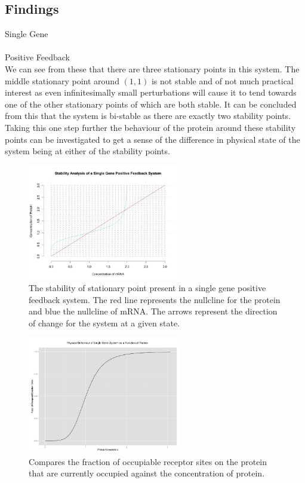 \documentclass[]{article}
\begin{document}
\subsection{Findings}
Single Gene\\
\\
Positive Feedback\\ 
We can see from these that there are three stationary points in this system. The middle stationary point around $(1,1)$ is not stable and of not much practical interest as even infinitesimally small perturbations will cause it to tend towards one of the other stationary points of which are both stable. It can be concluded from this that the system is bi-stable as there are exactly two stability points. Taking this one step further the behaviour of the protein around these stability points can be investigated to get a sense of the difference in physical state of the system being at either of the stability points. 
            
             \begin{figure}[h!]
            \centering
            \includegraphics[width=0.6\textwidth]{./figures/stabilitySinglePositive.jpeg}
            \caption{The stability of stationary point present in a single gene positive feedback system. The red line represents the nullcline for the protein and blue the nullcline of mRNA. The arrows represent the direction of change for the system at a given state.}
            \label{stabilitySinglePositive}
            \end{figure}
            
                    
             \begin{figure}[h!]
            \centering
            \includegraphics[width=0.6\textwidth]{./figures/singlePositiveHill.jpeg}
            \caption{Compares the fraction of occupiable receptor sites on the protein that are currently occupied against the concentration of protein.}
            \label{singlePositiveHill}
            \end{figure}
    
\end{document}
